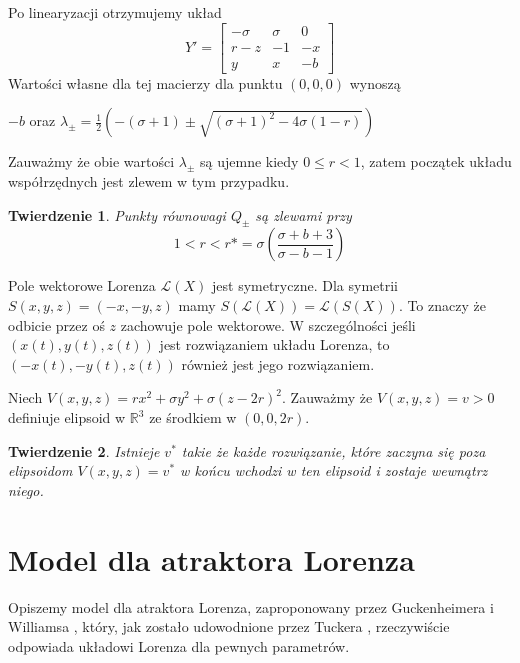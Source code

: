\documentclass[12pt]{report}
\newtheorem{theorem}{Twierdzenie}
\newcommand{\R}{\mathbb{R}}
\begin{document}
	\par Po linearyzacji otrzymujemy układ
		\[ Y' = \begin{bmatrix}
					-\sigma & \sigma & 0 \\
					r-z & -1 & -x \\
					y & x & -b
				\end{bmatrix}
		\]
	Wartości własne dla tej macierzy dla punktu $(0, 0, 0)$ wynoszą
	\begin{center}
		$-b$ oraz $\lambda_{\pm} = \frac{1}{2} (-(\sigma + 1) \pm \sqrt{(\sigma + 1)^2 - 4\sigma (1 - r)})$
	\end{center}
	Zauważmy że obie wartości $\lambda_{\pm}$ są ujemne kiedy $0 \le r < 1$, zatem początek układu współrzędnych jest zlewem w tym przypadku.
	\begin{theorem}
		Punkty równowagi $Q_{\pm}$ są zlewami przy
		\[ 1 < r < r* = \sigma (\frac{\sigma + b + 3}{\sigma - b - 1}) \]
	\end{theorem}
	
	\par Pole wektorowe Lorenza $\mathcal{L}(X)$ jest symetryczne. Dla symetrii $S(x, y, z) = (-x, -y, z)$ mamy $S(\mathcal{L}(X)) = \mathcal{L}(S(X))$. To znaczy że odbicie przez oś $z$ zachowuje pole wektorowe. W szczególności jeśli $(x(t), y(t), z(t))$ jest rozwiązaniem układu Lorenza, to $(-x(t), -y(t), z(t))$ również jest jego rozwiązaniem.
	\\
	\par Niech $V(x, y, z) = rx^2 + \sigma y^2 + \sigma (z - 2r)^2$. Zauważmy że $V(x, y, z) = v > 0$ definiuje elipsoid w $\R^3$ ze środkiem w $(0, 0, 2r)$.
	\begin{theorem}
		Istnieje $v^*$ takie że każde rozwiązanie, które zaczyna się poza elipsoidom $V(x, y, z) = v^*$ w końcu wchodzi w ten elipsoid i zostaje wewnątrz niego.
	\end{theorem}

	\section{Model dla atraktora Lorenza}
	\par Opiszemy model dla atraktora Lorenza, zaproponowany przez Guckenheimera i Williamsa \cite{GW}, który, jak zostało udowodnione przez Tuckera \cite{Tucker}, rzeczywiście odpowiada układowi Lorenza dla pewnych parametrów.
	
\end{document}
